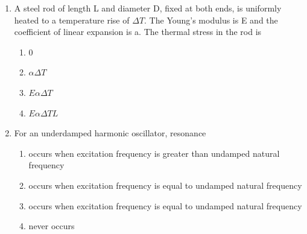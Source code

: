 \documentclass[journal]{IEEEtran}
\begin{document}
\begin{enumerate}
\begin{enumerate}
\end{enumerate}
\bigskip
\item A steel rod of length L and diameter D, fixed at both ends, is uniformly heated to a temperature rise of $\Delta T$. The Young's modulus is E and the coefficient of linear expansion is a. The thermal stress in the rod is
\begin{multicols}{4}
    \begin{enumerate}
        \item $0$
        \item $\alpha\Delta T$
        \item $E\alpha\Delta T$
        \item $E\alpha\Delta TL$
    \end{enumerate}
\end{multicols}
\bigskip
\item For an underdamped harmonic oscillator, resonance

\begin{enumerate}
        \item occurs when excitation frequency is greater than undamped natural frequency
        \item occurs when excitation frequency is equal to undamped natural frequency
        \item occurs when excitation frequency is equal to undamped natural frequency
        \item never occurs
\end{enumerate}


\end{enumerate}
\end{document}
